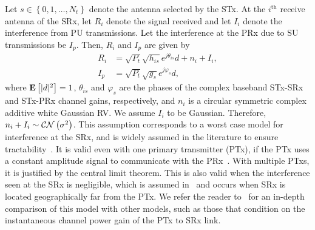 \documentclass[12pt,draftcls,peerreview,onecolumn]{IEEEtran}
\newcommand{\CN}{{\cal CN}}
\newcommand{\expect}[1]{{\bf{E}}\left[{#1}\right]}
\newcommand{\nx}{{0}}
\newcommand{\Nt}{{N_t}}
\newcommand{\Pt}{{P_t}}
\newcommand{\such}{h}
\newcommand{\puch}{g}
\newcommand{\hk}[1]{{\such_{#1}}}
\newcommand{\gk}[1]{{\puch_{#1}}}
\newcommand{\Rsrx}{R_{i}}
\newcommand{\Iprx}{I_{p}}
\newcommand{\Isrx}{I_{i}}
\newcommand{\noise}{n_i}
\newcommand{\noisevar}{\sigma^2}
\newcommand{\allopts}{\left\{\nx,1,\ldots,\Nt\right\}}
\newcommand{\suchph}{\theta}
\newcommand{\puchph}{\varphi}
\newcommand{\thetahk}{\suchph_{is}}
\newcommand{\thetagk}{\puchph_{s}}
\newcommand{\ith}{i^{\text{th}}}
\newcommand{\datasymbol}{d}
\begin{document}
Let $s\in\allopts$ denote the antenna selected by the STx. %
 At the $\ith$ receive antenna of the SRx, let $\Rsrx$ denote the signal received and let $\Isrx$ denote the interference from PU transmissions. Let the interference at the PRx due to SU transmissions be $\Iprx$. Then, $\Rsrx$ and $\Iprx$ are given by
%
\begin{align}
\label{eq:r_su}
 \Rsrx &= \sqrt{\Pt}\sqrt{\hk{is}} e^{j\thetahk} \datasymbol + \noise + \Isrx, \\
 \label{eq:i}
 \Iprx &= \sqrt{\Pt}\sqrt{\gk{s}} e^{j\thetagk} \datasymbol ,
\end{align}
%
where $\expect{|\datasymbol|^2}=1$, $\thetahk$ and $\thetagk$ are the phases of the complex baseband STx-SRx and STx-PRx channel gains, respectively, and $\noise$ is a circular symmetric complex additive white Gaussian RV. We assume $\Isrx$ to be Gaussian. Therefore, $\noise + \Isrx\sim \CN\left(\noisevar\right)$. This assumption corresponds to a worst case model for interference at the SRx, and is widely assumed in the literature to ensure tractability~\cite{Sarvendranath_2013_TCOM,Wang_2011_TCom, Kashyap_2014_TCOM,Sarvendranath_2014_TCOM}. It is valid even with one primary transmitter (PTx), if the PTx uses a constant amplitude signal to communicate with the PRx~\cite{Kashyap_2014_TCOM}. With multiple PTxs, it is justified by the central limit theorem. This is also valid when the interference seen at the SRx is negligible, which is assumed in~\cite{musavian_2009_tcom,RZhang_2009_TWC,li_2011_pimrc} and occurs when SRx is located geographically far from the PTx. We refer the reader to~\cite{das_2015_twc} for an in-depth comparison of this model with other models, such as those that condition on the instantaneous channel power gain of the PTx to SRx link. 
\end{document}
